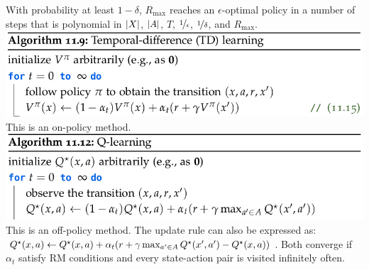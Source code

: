With probability at least $1-\delta$, $R_\mathrm{max}$ reaches an $\epsilon$-optimal policy in a number of steps that is polynomial in $\left| X \right|$, $\left| A \right|$, $T$, $\nicefrac{1}{\epsilon}$, $\nicefrac{1}{\delta}$, and $R_\mathrm{max}$.
\includegraphics[width=0.95\linewidth,trim={0 0 4cm 0}]{images/TD_learning.png}
This is an on-policy method.
\includegraphics[width=0.95\linewidth, trim={0 0 3cm 0}]{images/Q_learning.png}
This is an off-policy method.
The update rule can also be expressed as: $\Q*{x}{a} \gets \Q*{x}{a} + \alpha_t\parentheses*{r + \gamma \max_{a' \in \sA} \Q*{x'}{a'} - \Q*{x}{a}}$.
Both converge if $\alpha_t$ satisfy RM conditions and every state-action pair is visited infinitely often.
